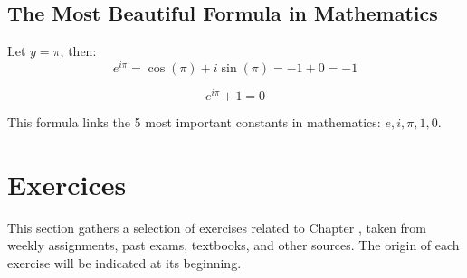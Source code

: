 \subsection{The Most Beautiful Formula in Mathematics}
Let $y = \pi$, then:
\[e^{i\pi} = \cos(\pi) + i \sin(\pi) = -1 + 0 = -1\]
\begin{theorem}
    \[e^{i\pi} + 1 = 0
    \]
\end{theorem}
This formula links the 5 most important constants in mathematics: $e, i, \pi, 1, 0$.

\section{Exercices} %
This section gathers a selection of exercises related to Chapter \thechapter, taken from weekly assignments, past exams, textbooks, and other sources. The origin of each exercise will be indicated at its beginning.